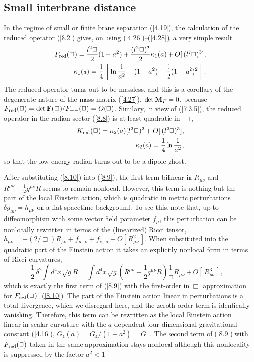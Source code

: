 \documentclass[a4paper,preprint,nofootinbib,
                 showpacs,preprintnumbers,amsmath,amssymb]{revtex4}
\begin{document}
\subsection{Small interbrane distance} 
In the regime of small or finite brane 
separation (\ref{4.19}), the calculation of the reduced operator 
(\ref{8.2}) gives, on using (\ref{4.26})--(\ref{4.28}), a very simple 
result, 
    \begin{eqnarray} 
    &&F_{\rm red}(\Box)=\frac{l^2\Box}2(1-a^2) 
    +\frac{(l^2\Box)^2}2\kappa_1(a) 
    +O[\,(l^2\Box)^3],                   \label{8.10}\\ 
    &&\kappa_1(a)=\frac14\, 
    \left[\,\ln\frac1{a^2}-(1-a^2)- 
      \frac12 (1-a^2)^2\,\right].       \label{8.10a} 
    \end{eqnarray} 
The reduced operator turns out to be massless, and this is a 
corollary of the degenerate nature of the mass matrix 
(\ref{4.27}), $\det{\bf M}_F=0$, because  
$F_{\rm red}(\Box)=\det{\bf F}(\Box)/F_{--}(\Box)=O(\Box)$.  
Similary, in view of (\ref{7.3.5}), the reduced operator in  
the radion sector (\ref{8.8}) is at least quadratic in $\Box$, 
    \begin{eqnarray} 
    &&K_{\rm red}(\Box)= 
    \kappa_2(a)(l^2\Box)^2 
    +O[\,(l^2\Box)^3],             \label{8.14}\\ 
    &&\kappa_2(a)= 
    \frac14\ln\frac1{a^2},           \label{8.15} 
    \end{eqnarray} 
so that the low-energy radion turns out to be a dipole ghost.  
 
 
After substituting (\ref{8.10}) 
into (\ref{8.9}), the first term bilinear in $R_{\mu\nu}$ and 
$R^{\mu\nu}-\frac12g^{\mu\nu}R$ seems to remain nonlocal. However, 
this term is nothing but the part of the local Einstein action, 
which is quadratic in metric perturbations $\delta 
g_{\mu\nu}=h_{\mu\nu}$ on a flat spacetime background. To see 
this, note that, up to diffeomorphism with some vector field 
parameter $f_\mu$, this perturbation can be nonlocally rewritten 
in terms of the (linearized) Ricci tensor, 
    $h_{\mu\nu}=-(2/\Box)R_{\mu\nu}+ 
    f_{\mu\,,\,\nu}+ 
    f_{\nu\,,\,\mu}+O[\,R^2_{\mu\nu}\,]$. 
When substituted into the quadratic part of the Einstein action it 
takes an explicitly nonlocal form in terms of Ricci curvatures, 
    \begin{equation} 
    \frac12\,\delta^2\!\!\int d^4x\, 
    \sqrt{g}R=\int d^4x\,\sqrt{g} 
    \left(R^{\mu\nu}-\frac12 
    g^{\mu\nu}R\right)\frac1\Box R_{\mu\nu} 
    +O[\,R^3_{\mu\nu}\,],                  \label{8.12} 
    \end{equation} 
which is exactly the first term of (\ref{8.9}) with the first-order 
in $\Box$ approximation for $F_{\rm red}(\Box)$, (\ref{8.10}). The part 
of the Einstein action linear in perturbations is a total 
divergence, which we disregard here, and the zeroth order term is 
identically vanishing. Therefore, this term can be rewritten as 
the local Einstein action linear in scalar curvature with the 
$a$-dependent four-dimensional gravitational constant 
(\ref{4.16}), $G_4(a)=G_4/(1-a^2)=G^+$. The second term of 
(\ref{8.9}) with $F_{\rm red}(\Box)$ taken in the same approximation  
stays nonlocal although this nonlocality is suppressed by the factor 
$a^2<1$. 
 
\end{document}

